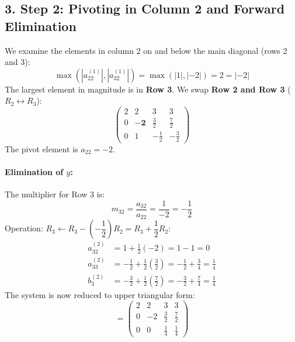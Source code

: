 \documentclass[11pt,a4paper]{article}
\newcommand{\abs}[1]{\left\lvert#1\right\rvert}
\begin{document}
\subsection*{3. Step 2: Pivoting in Column 2 and Forward Elimination}
We examine the elements in column 2 on and below the main diagonal (rows 2 and 3):
\[
\max\left( \abs{a_{22}^{(1)}}, \abs{a_{32}^{(1)}} \right) = \max\left( \abs{1}, \abs{-2} \right) = 2 = \abs{-2}
\]
The largest element in magnitude is in \textbf{Row 3}. We swap \textbf{Row 2 and Row 3} ($R_2 \leftrightarrow R_3$):
\begin{equation}
\left(\begin{array}{ccc|c}
2 & 2 & 3 & 3 \\
0 & \mathbf{-2} & \frac{3}{2} & \frac{7}{2} \\
0 & 1 & -\frac{1}{2} & -\frac{3}{2}
\end{array}\right)
\end{equation}
The pivot element is $a_{22} = -2$.

\paragraph{Elimination of $y$:}
The multiplier for Row 3 is:
\[
m_{32} = \frac{a_{32}}{a_{22}} = \frac{1}{-2} = -\frac{1}{2}
\]
Operation: $R_3 \leftarrow R_3 - \left(-\dfrac{1}{2}\right) R_2 = R_3 + \dfrac{1}{2} R_2$:
\begin{align*}
    a_{32}^{(2)} &= 1 + \frac{1}{2}(-2) = 1 - 1 = 0 \\
    a_{33}^{(2)} &= -\frac{1}{2} + \frac{1}{2}\left(\frac{3}{2}\right) = -\frac{1}{2} + \frac{3}{4} = \frac{1}{4} \\
    b_3^{(2)} &= -\frac{3}{2} + \frac{1}{2}\left(\frac{7}{2}\right) = -\frac{3}{2} + \frac{7}{4} = \frac{1}{4}
\end{align*}
The system is now reduced to upper triangular form:
\begin{equation}
[U \mid \mathbf{c}] = \left(\begin{array}{ccc|c}
2 & 2 & 3 & 3 \\
0 & -2 & \frac{3}{2} & \frac{7}{2} \\
0 & 0 & \frac{1}{4} & \frac{1}{4}
\end{array}\right)
\end{equation}
\end{document}
